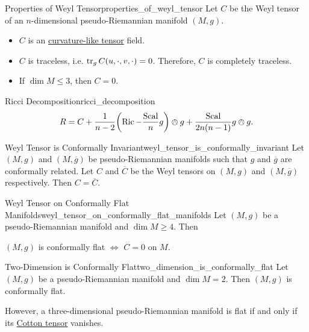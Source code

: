 \documentclass{article}
\begin{document}
\begin{proposition}{Properties of Weyl Tensor}{properties_of_weyl_tensor}
    Let $C$ be the Weyl tensor of an $n$-dimensional pseudo-Riemannian manifold $(M,g)$.
    \begin{itemize}
        \item $C$ is an \hyperref[Riemannian-def:curvature_like_tensor]{curvature-like tensor} field. 
        \item $C$ is traceless, i.e. $\tr_g C(u, \cdot, v, \cdot) = 0$. Therefore, $C$ is completely traceless.
        \item If $\dim M \le 3$, then $C = 0$.
    \end{itemize}
\end{proposition}

\begin{theorem}{Ricci Decomposition}{ricci_decomposition}
    \[ R = C + \frac{1}{n-2}\qty(\operatorname{Ric} - \frac{\operatorname{Scal}}{n}g) \owedge g + \frac{\operatorname{Scal}}{2n(n-1)} g\owedge g. \]
\end{theorem}

\begin{theorem}{Weyl Tensor is Conformally Invariant}{weyl_tensor_is_conformally_invariant}
    Let $(M,g)$ and $(M,\overline{g})$ be pseudo-Riemannian manifolds such that $g$ and $\overline{g}$ are conformally related.
    Let $C$ and $\overline{C}$ be the Weyl tensors on $(M,g)$ and $(M,\overline{g})$ respectively.
    Then $C = \overline{C}$.
\end{theorem}

\begin{theorem}{Weyl Tensor on Conformally Flat Manifolds}{weyl_tensor_on_conformally_flat_manifolds}
    Let $(M,g)$ be a pseudo-Riemannian manifold and $\dim M \ge 4$. Then
    \begin{center}
        $(M,g)$ is conformally flat $\Leftrightarrow$ $C = 0$ on $M$.
    \end{center}
\end{theorem}

\begin{theorem}{Two-Dimension is Conformally Flat}{two_dimension_is_conformally_flat}
    Let $(M,g)$ be a pseudo-Riemannian manifold and $\dim M = 2$. Then $(M,g)$ is conformally flat.
\end{theorem}

However, a three-dimensional pseudo-Riemannian manifold is flat if and only if its \href{https://en.wikipedia.org/wiki/Cotton_tensor}{Cotton tensor} vanishes.
\end{document}
